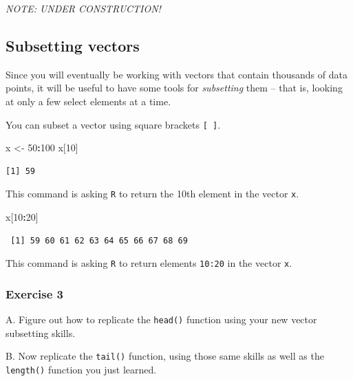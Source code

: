 \documentclass[
]{book}
\newenvironment{Shaded}{\begin{snugshade}}{\end{snugshade}}
\newcommand{\DecValTok}[1]{\textcolor[rgb]{0.00,0.00,0.81}{#1}}
\newcommand{\NormalTok}[1]{#1}
\newcommand{\OperatorTok}[1]{\textcolor[rgb]{0.81,0.36,0.00}{\textbf{#1}}}
\newcommand{\StringTok}[1]{\textcolor[rgb]{0.31,0.60,0.02}{#1}}
\begin{document}
\emph{NOTE: UNDER CONSTRUCTION!}

\hypertarget{subsetting-vectors}{%
\subsection*{Subsetting vectors}\label{subsetting-vectors}}

Since you will eventually be working with vectors that contain thousands of data points, it will be useful to have some tools for \emph{subsetting} them -- that is, looking at only a few select elements at a time.

You can subset a vector using square brackets \texttt{{[}\ {]}}.

\begin{Shaded}
\begin{Highlighting}[]
\NormalTok{x <-}\StringTok{ }\DecValTok{50}\OperatorTok{:}\DecValTok{100}
\NormalTok{x[}\DecValTok{10}\NormalTok{]}
\end{Highlighting}
\end{Shaded}

\begin{verbatim}
[1] 59
\end{verbatim}

This command is asking \texttt{R} to return the 10th element in the vector \texttt{x}.

\begin{Shaded}
\begin{Highlighting}[]
\NormalTok{x[}\DecValTok{10}\OperatorTok{:}\DecValTok{20}\NormalTok{]}
\end{Highlighting}
\end{Shaded}

\begin{verbatim}
 [1] 59 60 61 62 63 64 65 66 67 68 69
\end{verbatim}

This command is asking \texttt{R} to return elements \texttt{10:20} in the vector \texttt{x}.

\hypertarget{exercise-3-2}{%
\subsubsection*{Exercise 3}\label{exercise-3-2}}

A. Figure out how to replicate the \texttt{head()} function using your new vector subsetting skills.

B. Now replicate the \texttt{tail()} function, using those same skills as well as the \texttt{length()} function you just learned.
\end{document}
